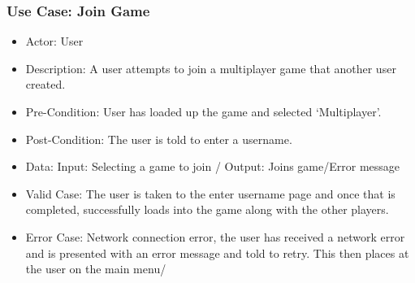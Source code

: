 \documentclass{article}
\begin{document}
\subsubsection{Use Case: Join Game}
\begin{itemize}
	\item Actor: User
	\item Description: A user attempts to join a multiplayer game that another user created.
	\item Pre-Condition: User has loaded up the game and selected ‘Multiplayer’.
	\item Post-Condition: The user is told to enter a username.
	\item Data: Input: Selecting a game to join / Output: Joins game/Error message
	\item Valid Case: The user is taken to the enter username page and once that is completed, successfully loads into the game along with the other players.
	\item Error Case: Network connection error, the user has received a network error and is presented with an error message and told to retry. This then places at the user on the main menu/

\end{itemize}
\end{document}
